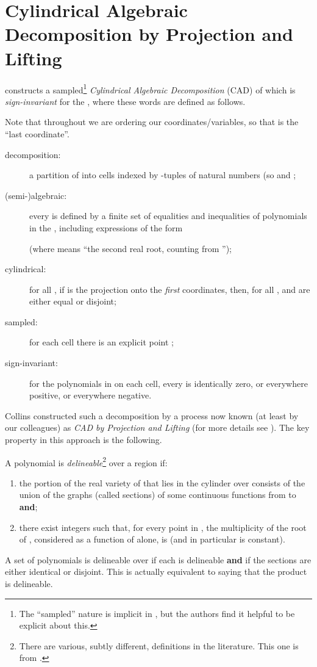 \documentclass[runningheads,a4paper]{llncs}
\begin{document}
\section{Cylindrical Algebraic Decomposition by Projection and Lifting}
\label{sec:PL}

\cite{Collins1975} constructs a sampled\footnote{The ``sampled'' nature is implicit in \cite[and its successors]{Collins1975}, but the authors find it helpful to be explicit about this.} \emph{Cylindrical Algebraic Decomposition} (CAD) of  which is \emph{sign-invariant} for the , where these words are defined as follows.
\begin{definition}\label{def:cad}
Note that throughout we are ordering our coordinates/\allowbreak{}vari\-ables, so that  is the ``last coordinate''.
\begin{description}
\item[decomposition:] a partition of  into cells  indexed by -tuples of natural numbers (so  and ;
\item[{\rm(semi-)}algebraic:] every  is defined by a finite set of equalities and inequalities of polynomials in the , including expressions of the form

(where  means ``the second real root, counting from '');
\item[cylindrical:] for all , if  is the projection onto the \emph{first}  coordinates, then, for all ,  and  are either equal or disjoint;
\item[sampled:] for each cell  there is an explicit point ;
\item[sign-invariant:] for the polynomials in  on each cell, every  is identically zero, or everywhere positive, or everywhere negative.
\end{description}
\end{definition}
Collins constructed such a decomposition by a process now known (at least by our colleagues) as \emph{CAD by Projection and Lifting} (for more details see \cite{Davenport2015c}).  The key property in this approach is the following.
\begin{definition}\label{def:del}
A polynomial  is \emph{delineable}\footnote{There are various, subtly different, definitions in the literature. This one is from \cite{McCallum1999a}.} over a region  if:
\begin{enumerate}
\item the portion of the real variety of  that lies in the cylinder  over  consists of the union of the graphs (called sections) of some  continuous functions  from  to  {\bf and};
\item there exist integers  such that, for every point  in , the multiplicity of the root  of , considered as a function of  alone, is  (and in particular is constant).
\end{enumerate}
A set of polynomials is delineable over  if each is delineable {\bf and} if the sections are either identical or disjoint. This is actually equivalent to saying that the product is delineable.
\end{definition}
\end{document}

